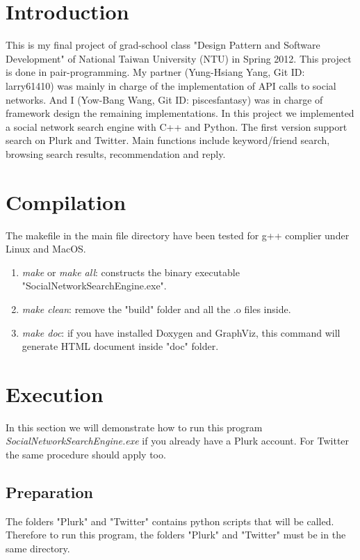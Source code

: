 \documentclass[12pt]{article}
\begin{document}
\section{Introduction}

This is my final project of grad-school class "Design Pattern and Software Development" of National Taiwan University (NTU) in Spring 2012. This project is done in pair-programming. My partner (Yung-Hsiang Yang, Git ID: larry61410) was mainly in charge of the implementation of API calls to social networks. And I (Yow-Bang Wang, Git ID: piscesfantasy) was in charge of framework design the remaining implementations. In this project we implemented a social network search engine with C++ and Python. The first version support search on Plurk and Twitter. Main functions include keyword/friend search, browsing search results, recommendation and reply.

\section{Compilation}

The makefile in the main file directory have been tested for g++ complier under Linux and MacOS.
\begin{enumerate}
\item {\it make} or {\it make all}: constructs the binary executable "SocialNetworkSearchEngine.exe".
\item {\it make clean}: remove the "build" folder and all the .o files inside.
\item {\it make doc}: if you have installed Doxygen and GraphViz, this command will generate HTML document inside "doc" folder. 
\end{enumerate}

\section{Execution}

In this section we will demonstrate how to run this program {\it SocialNetworkSearchEngine.exe} if you already have a Plurk account. For Twitter the same procedure should apply too.

\subsection{Preparation}

The folders "Plurk" and "Twitter" contains python scripts that will be called. Therefore to run this program, the folders "Plurk" and "Twitter" must be in the same directory.
\end{document}
